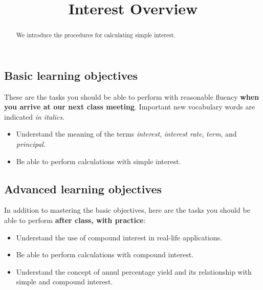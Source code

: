 \documentclass{ximera}
\title{Interest Overview}
\begin{document}
\begin{abstract}
We introduce the procedures for calculating simple interest.
\end{abstract}
\maketitle

\subsection*{Basic learning objectives}

These are the tasks you should be able to perform with reasonable fluency \textbf{when you arrive at our next class meeting}. Important new vocabulary words are indicated \emph{in italics}. 

\begin{itemize}
	\item Understand the meaning of the terms \emph{interest}, \emph{interest rate}, \emph{term}, and \emph{principal}.
    \item Be able to perform calculations with simple interest.
\end{itemize}

\subsection*{Advanced learning objectives}

In addition to mastering the basic objectives, here are the tasks you should be able to perform \textbf{after class, with practice}: 

\begin{itemize}
	\item Understand the use of compound interest in real-life applications.
	\item Be able to perform calculations with compound interest.
    \item Understand the concept of annul percentage yield and its relationship with simple and compound interest.
\end{itemize}
\end{document}
